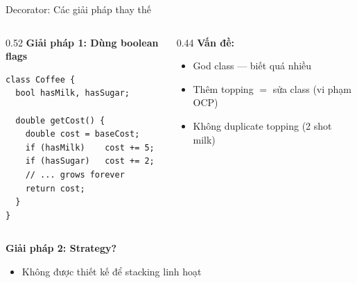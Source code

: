\begin{frame}[fragile]{Decorator: Các giải pháp thay thế}
  \begin{columns}[T]
    \begin{column}{0.52\textwidth}
      \textbf{Giải pháp 1: Dùng boolean flags}
      
      \vspace{0.2em}
      \footnotesize
      \begin{verbatim}
class Coffee {
  bool hasMilk, hasSugar;

  double getCost() {
    double cost = baseCost;
    if (hasMilk)    cost += 5;
    if (hasSugar)   cost += 2;
    // ... grows forever
    return cost;
  }
}
      \end{verbatim}
    \end{column}
    \begin{column}{0.44\textwidth}
      \textcolor{myred}{\textbf{Vấn đề:}}
      
      \vspace{0.2em}
      \begin{itemize}
        \item God class --- biết quá nhiều
        \item Thêm topping $=$ sửa class \textcolor{myred}{(vi phạm OCP)}
        \item Không duplicate topping (2 shot milk)
      \end{itemize}
    \end{column}
  \end{columns}

  \vspace{0.3em}
  \textbf{Giải pháp 2: Strategy?}
  \begin{itemize}
    \item Không được thiết kế để stacking linh hoạt
  \end{itemize}
\end{frame}

